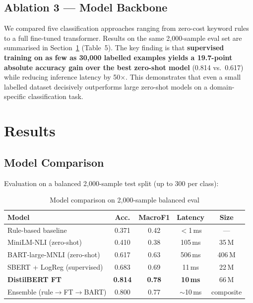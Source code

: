 \documentclass[11pt,a4paper]{article}
\begin{document}
\subsection{Ablation 3 — Model Backbone}

We compared five classification approaches ranging from zero-cost keyword
rules to a full fine-tuned transformer. Results on the same 2,000-sample
eval set are summarised in Section~\ref{sec:results} (Table~5). The key
finding is that \textbf{supervised training on as few as 30,000 labelled
examples yields a 19.7-point absolute accuracy gain over the best zero-shot
model} (0.814 vs.\ 0.617) while reducing inference latency by 50$\times$.
This demonstrates that even a small labelled dataset decisively outperforms
large zero-shot models on a domain-specific classification task.

\section{Results}
\label{sec:results}

\subsection{Model Comparison}

Evaluation on a balanced 2,000-sample test split (up to 300 per class):

\begin{table}[H]\centering
\caption{Model comparison on 2,000-sample balanced eval}
\begin{tabular}{lcccc}
\toprule
\textbf{Model} & \textbf{Acc.} & \textbf{MacroF1} & \textbf{Latency} & \textbf{Size}\\
\midrule
Rule-based baseline          & 0.371 & 0.42 & $<$1\,ms  & —\\
MiniLM-NLI (zero-shot)       & 0.410 & 0.38 & 105\,ms   & 35\,M\\
BART-large-MNLI (zero-shot)  & 0.617 & 0.63 & 506\,ms   & 406\,M\\
SBERT + LogReg (supervised)  & 0.683 & 0.69 &  11\,ms   & 22\,M\\
\textbf{DistilBERT FT}       & \textbf{0.814} & \textbf{0.78} & \textbf{10\,ms} & 66\,M\\
Ensemble (rule$\to$FT$\to$BART) & 0.800 & 0.77 & $\sim$10\,ms & composite\\
\bottomrule
\end{tabular}
\end{table}
\end{document}
